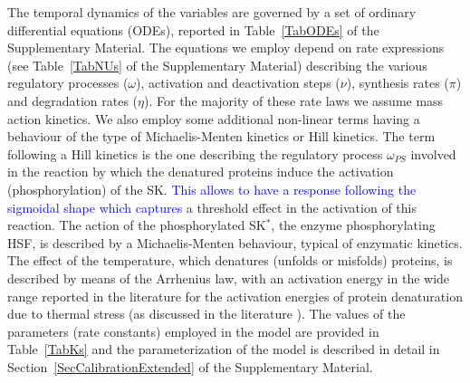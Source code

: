 \documentclass[oneside, 10pt, a4paper, twocolumn]{article}
\begin{document}
The temporal dynamics of the variables are governed by a set of ordinary differential equations (ODEs),
reported in Table~\ref{TabODEs} of the Supplementary Material. 
The equations we employ depend on rate expressions (see Table~\ref{TabNUs} of the Supplementary Material) describing the various regulatory processes ($\omega$), activation and deactivation steps ($\nu$), synthesis rates ($\pi$) and
degradation rates ($\eta$). 
For the majority of these rate laws we assume mass action kinetics. We also employ some additional non-linear terms having a behaviour of the type of Michaelis-Menten kinetics or Hill kinetics.  %
The term following a Hill kinetics is the one describing the regulatory process $\omega_{PS}$ involved in the reaction by which the denatured proteins induce the activation (phosphorylation) of the SK. \textcolor{blue}{This allows to have a response following the sigmoidal shape which captures} a threshold effect in the activation of this reaction. 
The action of the phosphorylated SK$^*$, the enzyme phosphorylating HSF, is described by a Michaelis-Menten behaviour, typical of enzymatic kinetics. 
The effect of the temperature, which denatures (unfolds or misfolds) proteins, is described by means of the Arrhenius law, with an activation energy 
in the wide range reported in the literature for the activation energies of protein denaturation due to thermal stress (as discussed in the literature \cite{Bischof2006,He2003}). 
The values of the parameters (rate constants) employed in the model are provided in Table~\ref{TabKs} and the parameterization of the model is described in detail in Section~\ref{SecCalibrationExtended} of the Supplementary Material.
\end{document}
